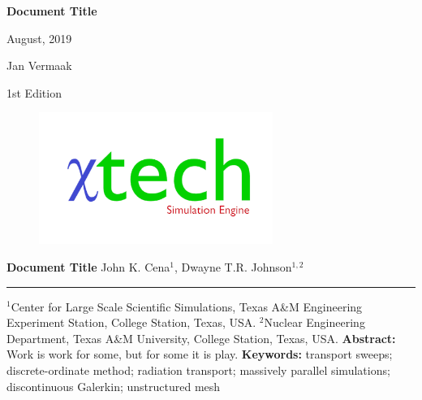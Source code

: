 \documentclass[10pt,letterpaper,openany,bibliography=totoc]{book}
\newcommand{\DOCTITLE}{Document Title}
\begin{document}
\frontmatter
\begin{titlepage}
	\pagestyle{fancy}
	\vspace*{1.0cm}
	\centering
	\vspace{1cm}
	\vspace{.25cm}
	{\Large\bfseries \DOCTITLE  \par}
	\vspace{1cm}
	{\Large August, 2019 \par}
	\vspace{1.0cm}
	{\Large Jan Vermaak \par}
	{\Large 1st Edition \par}
	\begin{center}
			\begin{minipage}[c]{0.45\textwidth}
				\begin{figure}[H]
					
					\includegraphics[width=3in]{Logo2_Medium.png}
				\end{figure}
			\end{minipage}
		\end{center}

\end{titlepage}	

\newpage 
\setcounter{page}{1}

\noindent
{\LARGE\textbf{\DOCTITLE}}
\newline
\newline
\newline
\noindent
{\Large John K. Cena${^1}$, Dwayne T.R. Johnson$^{1,2}$}
\newline
\noindent\rule{\textwidth}{1pt}
{\small $^1$Center for Large Scale Scientific Simulations, Texas A\&M Engineering Experiment Station, College Station, Texas, USA.}
\newline\noindent
{\small $^2$Nuclear Engineering Department, Texas A\&M University, College Station, Texas, USA.}
\newline
\newline
\textbf{Abstract:}\newline\noindent
Work is work for some, but for some it is play.
\newline
\newline\noindent
{\small
\textbf{Keywords:} transport sweeps; discrete-ordinate method; radiation transport; massively parallel simulations; discontinuous Galerkin; unstructured mesh}
\end{document}
